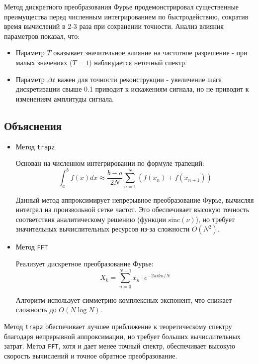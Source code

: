 \documentclass[a4paper,12pt]{article}
\begin{document}
Метод дискретного преобразования Фурье продемонстрировал существенные преимущества перед численным интегрированием по быстродействию, сократив время вычислений в 2-3 раза при сохранении точности. Анализ влияния параметров показал, что:

\begin{itemize}
	\item Параметр \(T\) оказывает значительное влияние на частотное разрешение - при малых значениях (\(T = 1\)) наблюдается неточный спектр.
	\item Параметр \(\Delta t\) важен для точности реконструкции - увеличение шага дискретизации свыше 0.1 приводит к искажениям сигнала, но не приводит к изменениям амплитуды сигнала.
\end{itemize}

\newpage

\subsection{Объяснения}

\begin{itemize}
	
	\item Метод \texttt{trapz}
	
	Основан на численном интегрировании по формуле трапеций:
	\[
	\int_a^b f(x)dx \approx \frac{b-a}{2N}\sum_{n=1}^N (f(x_n) + f(x_{n+1}))
	\]
	
	Данный метод аппроксимирует непрерывное преобразование Фурье, вычисляя интеграл на произвольной сетке частот. Это обеспечивает высокую точность соответствия аналитическому решению (функции $\mathrm{sinc}(\nu)$), но требует значительных вычислительных ресурсов из-за сложности $O(N^2)$.
	
	\item Метод \texttt{FFT}
	
	Реализует дискретное преобразование Фурье:
	\[
	X_k = \sum_{n=0}^{N-1} x_n \cdot e^{-2\pi i kn/N}
	\]
	
	Алгоритм использует симметрию комплексных экспонент, что снижает сложность до $O(N\log N)$. 
\end{itemize}

Метод \texttt{trapz} обеспечивает лучшее приближение к теоретическому спектру благодаря непрерывной аппроксимации, но требует больших вычислительных затрат. Метод \texttt{FFT}, хотя и дает менее точный спектр, обеспечивает высокую скорость вычислений и точное обратное преобразование.

\newpage
\end{document}
